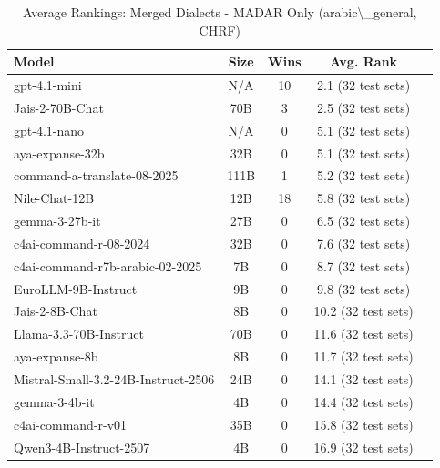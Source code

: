 \begin{table}[htbp]
\centering
\caption{Average Rankings: Merged Dialects - MADAR Only (arabic\textbackslash{}_general, CHRF)}
\label{tab:avg_rankings_chrf_arabic_general}
\begin{tabular}{l@{\hspace{3pt}}c@{\hspace{3pt}}c@{\hspace{3pt}}c@{\hspace{3pt}}c}
\toprule
Model & Size & Wins & Avg. Rank \\
\midrule
gpt-4.1-mini & N/A & 10 & 2.1 (32 test sets) \\
Jais-2-70B-Chat & 70B & 3 & 2.5 (32 test sets) \\
gpt-4.1-nano & N/A & 0 & 5.1 (32 test sets) \\
aya-expanse-32b & 32B & 0 & 5.1 (32 test sets) \\
command-a-translate-08-2025 & 111B & 1 & 5.2 (32 test sets) \\
Nile-Chat-12B & 12B & 18 & 5.8 (32 test sets) \\
gemma-3-27b-it & 27B & 0 & 6.5 (32 test sets) \\
c4ai-command-r-08-2024 & 32B & 0 & 7.6 (32 test sets) \\
c4ai-command-r7b-arabic-02-2025 & 7B & 0 & 8.7 (32 test sets) \\
EuroLLM-9B-Instruct & 9B & 0 & 9.8 (32 test sets) \\
Jais-2-8B-Chat & 8B & 0 & 10.2 (32 test sets) \\
Llama-3.3-70B-Instruct & 70B & 0 & 11.6 (32 test sets) \\
aya-expanse-8b & 8B & 0 & 11.7 (32 test sets) \\
Mistral-Small-3.2-24B-Instruct-2506 & 24B & 0 & 14.1 (32 test sets) \\
gemma-3-4b-it & 4B & 0 & 14.4 (32 test sets) \\
c4ai-command-r-v01 & 35B & 0 & 15.8 (32 test sets) \\
Qwen3-4B-Instruct-2507 & 4B & 0 & 16.9 (32 test sets) \\
\bottomrule
\end{tabular}
\end{table}